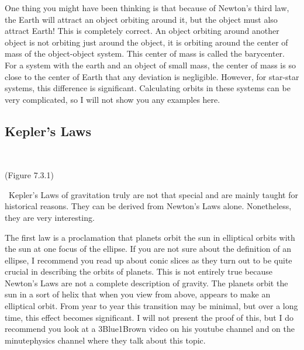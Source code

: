 \documentclass{article}[gray]
\numberwithin{equation}{subsection}
\begin{document}
One thing you might have been thinking is that because of Newton’s third law, the Earth will attract an object orbiting around it, but the object must also attract Earth! This is completely correct. An object orbiting around another object is not orbiting just around the object, it is orbiting around the center of mass of the object-object system. This center of mass is called the barycenter. For a system with the earth and an object of small mass, the center of mass is so close to the center of Earth that any deviation is negligible. However, for star-star systems, this difference is significant. Calculating orbits in these systems can be very complicated, so I will not show you any examples here.
\subsection{Kepler's Laws}
\
\
\
\begin{center}
(Figure 7.3.1)
\end{center}
\
Kepler’s Laws of gravitation truly are not that special and are mainly taught for historical reasons. They can be derived from Newton’s Laws alone. Nonetheless, they are very interesting.

The first law is a proclamation that planets orbit the sun in elliptical orbits with the sun at one focus of the ellipse. If you are not sure about the definition of an ellipse, I recommend you read up about conic slices as they turn out to be quite crucial in describing the orbits of planets. This is not entirely true because Newton’s Laws are not a complete description of gravity. The planets orbit the sun in a sort of helix that when you view from above, appears to make an elliptical orbit. From year to year this transition may be minimal, but over a long time, this effect becomes significant. I will not present the proof of this, but I do recommend you look at a 3Blue1Brown video on his youtube channel and on the minutephysics channel where they talk about this topic. 
\end{document}
